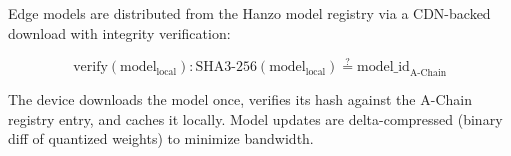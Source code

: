 Edge models are distributed from the Hanzo model registry via a CDN-backed
download with integrity verification:

\begin{equation}
\text{verify}(\text{model}_{\text{local}}) :
\text{SHA3-256}(\text{model}_{\text{local}}) \stackrel{?}{=}
\text{model\_id}_{\text{A-Chain}}
\end{equation}

The device downloads the model once, verifies its hash against the A-Chain
registry entry, and caches it locally. Model updates are delta-compressed
(binary diff of quantized weights) to minimize bandwidth.

